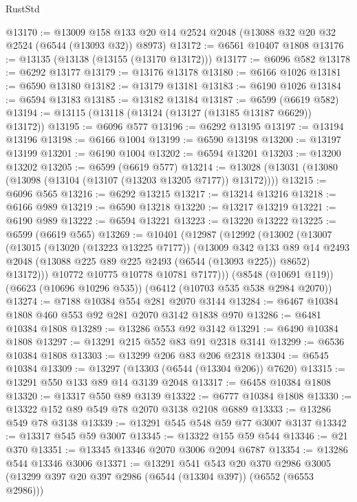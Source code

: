 \begin{lexlean}{RustStd}
\begin{coremodule}
@13170 := @13009 @158 @133 @20 @14 @2524 @2048 (@13088 @32 @20 @32 @2524 (@6544 (@13093 @32)) @8973)
@13172 := @6561 @10407 @1808
@13176 := @13135 (@13138 (@13155 (@13170 @13172)))
@13177 := @6096 @582
@13178 := @6292 @13177
@13179 := @13176 @13178
@13180 := @6166 @1026
@13181 := @6590 @13180
@13182 := @13179 @13181
@13183 := @6190 @1026
@13184 := @6594 @13183
@13185 := @13182 @13184
@13187 := @6599 (@6619 @582)
@13194 := @13115 (@13118 (@13124 (@13127 (@13185 @13187 @6629)) @13172))
@13195 := @6096 @577
@13196 := @6292 @13195
@13197 := @13194 @13196
@13198 := @6166 @1004
@13199 := @6590 @13198
@13200 := @13197 @13199
@13201 := @6190 @1004
@13202 := @6594 @13201
@13203 := @13200 @13202
@13205 := @6599 (@6619 @577)
@13214 := @13028 (@13031 (@13080 (@13098 (@13104 (@13107 (@13203 @13205 @7177)) @13172))))
@13215 := @6096 @565
@13216 := @6292 @13215
@13217 := @13214 @13216
@13218 := @6166 @989
@13219 := @6590 @13218
@13220 := @13217 @13219
@13221 := @6190 @989
@13222 := @6594 @13221
@13223 := @13220 @13222
@13225 := @6599 (@6619 @565)
@13269 := @10401
    (@12987
      (@12992
        (@13002
          (@13007
            (@13015
              (@13020 (@13223 @13225 @7177))
              (@13009
                @342
                @133
                @89
                @14
                @2493
                @2048
                (@13088 @225 @89 @225 @2493 (@6544 (@13093 @225)) @8652)
                @13172)))
          @10772
          @10775
          @10778
          @10781
          @7177)))
    (@8548 (@10691 @119))
    (@6623 (@10696 @10296 @535))
    (@6412 (@10703 @535 @538 @2984 @2070))
@13274 := @7188 @10384 @554 @281 @2070 @3144
@13284 := @6467 @10384 @1808 @460 @553 @92 @281 @2070 @3142 @1838 @970
@13286 := @6481 @10384 @1808
@13289 := @13286 @553 @92 @3142
@13291 := @6490 @10384 @1808
@13297 := @13291 @215 @552 @83 @91 @2318 @3141
@13299 := @6536 @10384 @1808
@13303 := @13299 @206 @83 @206 @2318
@13304 := @6545 @10384
@13309 := @13297 (@13303 (@6544 (@13304 @206)) @7620)
@13315 := @13291 @550 @133 @89 @14 @3139 @2048
@13317 := @6458 @10384 @1808
@13320 := @13317 @550 @89 @3139
@13322 := @6777 @10384 @1808
@13330 := @13322 @152 @89 @549 @78 @2070 @3138 @2108 @6889
@13333 := @13286 @549 @78 @3138
@13339 := @13291 @545 @548 @59 @77 @3007 @3137
@13342 := @13317 @545 @59 @3007
@13345 := @13322 @155 @59 @544
@13346 := @21 @370
@13351 := @13345 @13346 @2070 @3006 @2094 @6787
@13354 := @13286 @544 @13346 @3006
@13371 := @13291
    @541
    @543
    @20
    @370
    @2986
    @3005
    (@13299 @397 @20 @397 @2986 (@6544 (@13304 @397)) (@6552 (@6553 @2986)))

\end{coremodule}
\end{lexlean}
